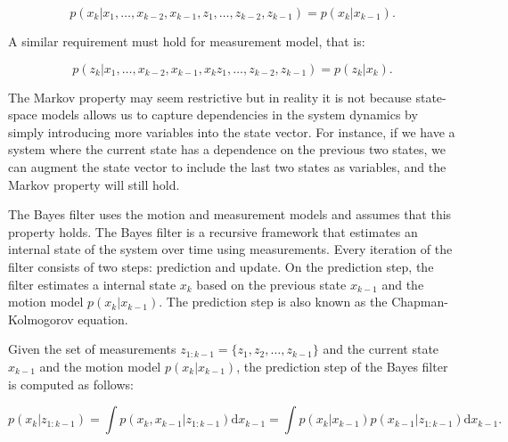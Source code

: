\begin{equation}
p(x_k | x_1, \ldots, x_{k-2}, x_{k-1},
        z_1, \ldots, z_{k-2}, z_{k-1}) 
    = p(x_k | x_{k-1}).
\end{equation}

A similar requirement must hold for measurement model, that is:

\begin{equation}
    p(z_k | x_1, \ldots, x_{k-2}, x_{k-1}, x_{k}
        z_1, \ldots, z_{k-2}, z_{k-1}) 
    = p(z_k | x_k).
\end{equation}

The Markov property may seem restrictive but in reality it is not because state-
space models allows us to capture dependencies in the system dynamics by simply 
introducing more variables into the state vector. For instance, if we have a 
system where the current state has a dependence on the previous two states, we 
can augment the state vector to include the last two states as variables, and 
the Markov property will still hold.

The Bayes filter uses the motion and measurement models and assumes that this
property holds. The Bayes filter is a recursive framework that estimates an
internal state of the system over time using measurements. Every iteration of
the filter consists of two steps: prediction and update. On the prediction step,
the filter estimates a internal state $x_k$ based on the previous state
$x_{k-1}$ and the motion model $p(x_k | x_{k-1})$. The prediction step
is also known as the Chapman-Kolmogorov equation.

\begin{theorem}\label{theorem:bayes-filter-predict}\label{theorem:chapman-kolmogorov}
    Given the set of measurements $z_{1:k-1} = \{z_1, z_2, \ldots, z_{k-1}\}$ 
    and the current state $x_{k-1}$ and the motion model $p(x_k | x_{k-1})$, 
    the prediction step of the Bayes filter is computed as follows:

    \begin{equation}
        p\left({x}_k | {z}_{1: k-1}\right)
        = \int 
            p\left(
                {x}_k, {x}_{k-1} | {z}_{1: k-1}
            \right)
            \mathrm{d} {x}_{k-1}
        = \int
            p\left(
                {x}_k | {x}_{k-1}\right
            ) p\left(
                {x}_{k-1} | {z}_{1: k-1}
            \right)
            \mathrm{d} {x}_{k-1}.
    \end{equation}
\end{theorem}

